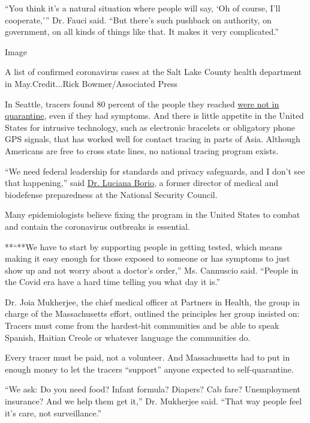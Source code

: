 ``You think it's a natural situation where people will say, `Oh of
course, I'll cooperate,''' Dr. Fauci said. ``But there's such pushback
on authority, on government, on all kinds of things like that. It makes
it very complicated.''

Image

A list of confirmed coronavirus cases at the Salt Lake County health
department in May.Credit...Rick Bowmer/Associated Press

In Seattle, tracers found 80 percent of the people they reached
\href{https://komonews.com/news/coronavirus/only-1-in-5-isolating-when-covid-symptoms-develop-king-county-says}{were
not in quarantine}, even if they had symptoms. And there is little
appetite in the United States for intrusive technology, such as
electronic bracelets or obligatory phone GPS signals, that has worked
well for contact tracing in parts of Asia. Although Americans are free
to cross state lines, no national tracing program exists.

``We need federal leadership for standards and privacy safeguards, and I
don't see that happening,'' said
\href{http://leighbureau.com/speakers/lborio}{Dr. Luciana Borio}, a
former director of medical and biodefense preparedness at the National
Security Council.

Many epidemiologists believe fixing the program in the United States to
combat and contain the coronavirus outbreaks is essential.

**``**We have to start by supporting people in getting tested, which
means making it easy enough for those exposed to someone or has symptoms
to just show up and not worry about a doctor's order,'' Ms. Cannuscio
said. ``People in the Covid era have a hard time telling you what day it
is.''

Dr. Joia Mukherjee, the chief medical officer at Partners in Health, the
group in charge of the Massachusetts effort, outlined the principles her
group insisted on: Tracers must come from the hardest-hit communities
and be able to speak Spanish, Haitian Creole or whatever language the
communities do.

Every tracer must be paid, not a volunteer. And Massachusetts had to put
in enough money to let the tracers ``support'' anyone expected to
self-quarantine.

``We ask: Do you need food? Infant formula? Diapers? Cab fare?
Unemployment insurance? And we help them get it,'' Dr. Mukherjee said.
``That way people feel it's care, not surveillance.''

